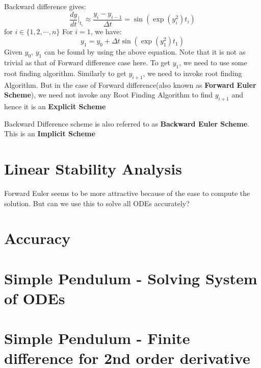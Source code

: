 \documentclass[
]{book}
\begin{document}
Backward difference gives:
\begin{equation}
\frac{dy}{dt}|_{t_i}\approx \frac{y_{i}-y_{i-1}}{\Delta t} = \sin(\exp(y_i^2)t_i)
\end{equation}
for \(i\in\{1,2, \cdots,n\}\)
For \(i=1\), we have:
\begin{equation}
y_1 = y_0 +\Delta t \sin(\exp(y_1^2)t_1)
\end{equation}
Given \(y_0\), \(y_1\) can be found by using the above equation. Note that it is not as trivial as that of Forward difference case here. To get \(y_1\), we need to use some root finding algorithm. Similarly to get \(y_{i+1}\), we need to invoke root finding Algorithm. But in the case of Forward difference(also known as \textbf{Forward Euler Scheme}), we need not invoke any Root Finding Algorithm to find \(y_{i+1}\) and hence it is an \textbf{Explicit Scheme}

Backward Difference scheme is also referred to as \textbf{Backward Euler Scheme}. This is an \textbf{Implicit Scheme}

\hypertarget{linear-stability-analysis}{%
\section{Linear Stability Analysis}\label{linear-stability-analysis}}

Forward Euler seems to be more attractive because of the ease to compute the solution. But can we use this to solve all ODEs accurately?

\hypertarget{accuracy}{%
\section{Accuracy}\label{accuracy}}

\hypertarget{simple-pendulum---solving-system-of-odes}{%
\section{Simple Pendulum - Solving System of ODEs}\label{simple-pendulum---solving-system-of-odes}}

\hypertarget{simple-pendulum---finite-difference-for-2nd-order-derivative}{%
\section{Simple Pendulum - Finite difference for 2nd order derivative}\label{simple-pendulum---finite-difference-for-2nd-order-derivative}}

  
\end{document}
